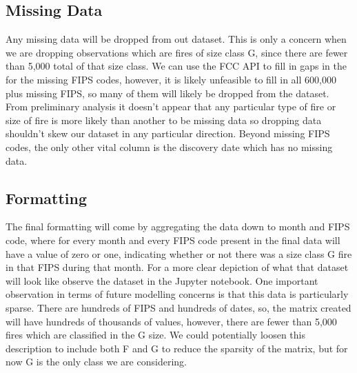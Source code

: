 \documentclass[12pt]{article}
\begin{document}
\subsection{\textrm{Missing Data}}

Any missing data will be dropped from out dataset. This is only a concern when we are dropping observations which are fires of size class G, since there are fewer than 5,000 total of that size class. We can use the FCC API to fill in gaps in the for the missing FIPS codes, however, it is likely unfeasible to fill in all 600,000 plus missing FIPS, so many of them will likely be dropped from the dataset. From preliminary analysis it doesn't appear that any particular type of fire or size of fire is more likely than another to be missing data so dropping data shouldn't skew our dataset in any particular direction. Beyond missing FIPS codes, the only other vital column is the discovery date which has no missing data. 

\subsection{\textrm{Formatting}}

The final formatting will come by aggregating the data down to month and FIPS code, where for every month and every FIPS code present in the final data will have a value of zero or one, indicating whether or not there was a size class G fire in that FIPS during that month. For a more clear depiction of what that dataset will look like observe the dataset in the Jupyter notebook. One important observation in terms of future modelling concerns is that this data is particularly sparse. There are hundreds of FIPS and hundreds of dates, so, the matrix created will have hundreds of thousands of values, however, there are fewer than 5,000 fires which are classified in the G size. We could potentially loosen this description to include both F and G to reduce the sparsity of the matrix, but for now G is the only class we are considering. 
\end{document}
